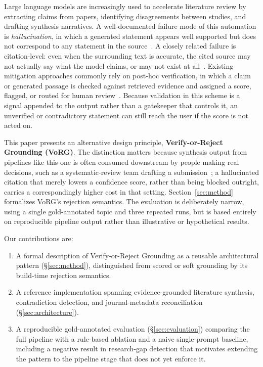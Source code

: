 \documentclass[11pt]{article}
\begin{document}
Large language models are increasingly used to accelerate literature review by extracting claims from papers, identifying disagreements between studies, and drafting synthesis narratives. A well-documented failure mode of this automation is \emph{hallucination}, in which a generated statement appears well supported but does not correspond to any statement in the source~\cite{zhang2025hallucination,ji2023survey,tonmoy2024comprehensive}. A closely related failure is citation-level: even when the surrounding text is accurate, the cited source may not actually say what the model claims, or may not exist at all~\cite{zhang2025citation}. Existing mitigation approaches commonly rely on post-hoc verification, in which a claim or generated passage is checked against retrieved evidence and assigned a score, flagged, or routed for human review~\cite{li2025enhancing}. Because validation in this scheme is a signal appended to the output rather than a gatekeeper that controls it, an unverified or contradictory statement can still reach the user if the score is not acted on.

This paper presents an alternative design principle, \textbf{Verify-or-Reject Grounding (VoRG)}. The distinction matters because synthesis output from pipelines like this one is often consumed downstream by people making real decisions, such as a systematic-review team drafting a submission~\cite{li2025enhancing}; a hallucinated citation that merely lowers a confidence score, rather than being blocked outright, carries a correspondingly higher cost in that setting. Section~\ref{sec:method} formalizes VoRG's rejection semantics. The evaluation is deliberately narrow, using a single gold-annotated topic and three repeated runs, but is based entirely on reproducible pipeline output rather than illustrative or hypothetical results.

Our contributions are:
\begin{enumerate}
 \item A formal description of Verify-or-Reject Grounding as a reusable architectural pattern (\S\ref{sec:method}), distinguished from scored or soft grounding by its build-time rejection semantics.

 \item A reference implementation spanning evidence-grounded literature synthesis, contradiction detection, and journal-metadata reconciliation (\S\ref{sec:architecture}).

 \item A reproducible gold-annotated evaluation (\S\ref{sec:evaluation}) comparing the full pipeline with a rule-based ablation and a naive single-prompt baseline, including a negative result in research-gap detection that motivates extending the pattern to the pipeline stage that does not yet enforce it.
\end{enumerate}
\end{document}
